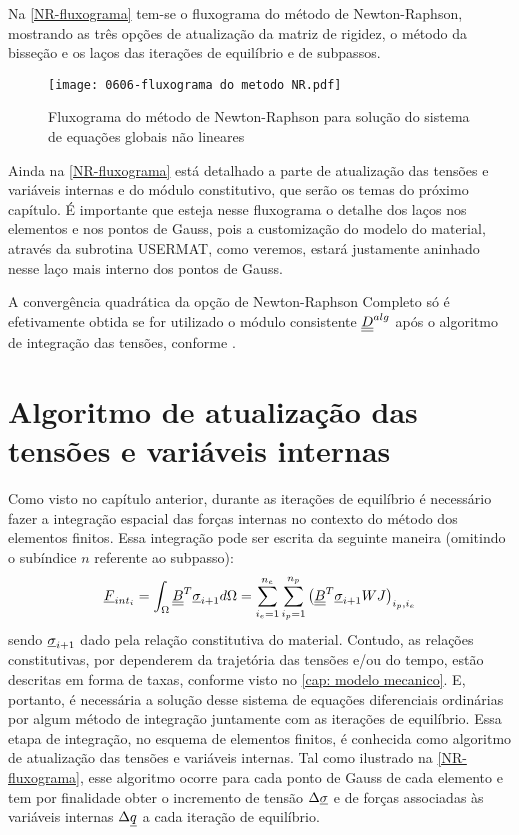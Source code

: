 Na \autoref{NR-fluxograma} tem-se o fluxograma do método de Newton-Raphson, mostrando as três opções de atualização da matriz de rigidez, o método da bisseção e os laços das iterações de equilíbrio e de subpassos.
\begin{figure}[H]
	\begin{center}
		\texttt{[image: 0606-fluxograma do metodo NR.pdf]}
	\end{center}
	\caption{\label{NR-fluxograma}Fluxograma do método de Newton-Raphson para solução do sistema de equações globais não lineares}
\end{figure}
Ainda na \autoref{NR-fluxograma} está detalhado a parte de atualização das tensões e variáveis internas e do módulo constitutivo, que serão os temas do próximo capítulo. É importante que esteja nesse fluxograma o detalhe dos laços nos elementos e nos pontos de Gauss, pois a customização do modelo do material, através da subrotina USERMAT, como veremos, estará justamente aninhado nesse laço mais interno dos pontos de Gauss.

A convergência quadrática da opção de Newton-Raphson Completo só é efetivamente obtida se for utilizado o módulo consistente $\underline{\underline D}^{alg}$ após o algoritmo de integração das tensões, conforme .

\section{Algoritmo de atualização das tensões e variáveis internas}

Como visto no capítulo anterior, durante as iterações de equilíbrio é necessário fazer a integração espacial das forças internas no contexto do método dos elementos finitos. Essa integração pode ser escrita da seguinte maneira (omitindo o subíndice $n$ referente ao subpasso):
\begin{equation}
	\label{eq:Fint}
	\underline{F}_{int_i} = \int_{\Omega}\underline{\underline B}^T\underline \sigma_{i+1}d\Omega = \sum_{i_e=1}^{n_e}\sum_{i_p=1}^{n_p}\left( \underline{\underline B}^T\underline \sigma_{i+1}WJ\right)_{i_p,i_e}
\end{equation}
sendo $\underline \sigma_{i+1}$ dado pela relação constitutiva do material. Contudo, as relações constitutivas, por dependerem da trajetória das tensões e/ou do tempo, estão descritas em forma de taxas, conforme visto no \autoref{cap: modelo mecanico}. E, portanto, é necessária a solução desse sistema de equações diferenciais ordinárias por algum método de integração juntamente com as iterações de equilíbrio. Essa etapa de integração, no esquema de elementos finitos, é conhecida como algoritmo de atualização das tensões e variáveis internas. Tal como ilustrado na \autoref{NR-fluxograma}, esse algoritmo ocorre para cada ponto de Gauss de cada elemento e tem por finalidade obter o incremento de tensão $\Delta \underline \sigma$ e de forças associadas às variáveis internas $\Delta \underline q$ a cada iteração de equilíbrio.

